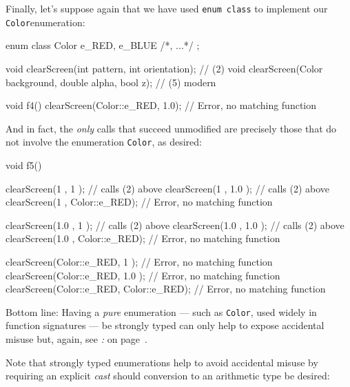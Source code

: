 \noindent Finally, let's suppose again that we have used
\texttt{enum}~\texttt{class} to implement our \texttt{Color}\linebreak[4]
\mbox{enumeration}:

\begin{emcppshiddenlisting}[emcppsbatch=e10]
enum class Color { e_RED, e_BLUE /*, ...*/ };
\end{emcppshiddenlisting}
\begin{emcppslisting}[emcppsbatch=e10]
void clearScreen(int pattern, int orientation);            // (2)
void clearScreen(Color background, double alpha, bool z);  // (5) modern

void f4()
{
    clearScreen(Color::e_RED, 1.0);  // Error, no matching function
}
\end{emcppslisting}

\noindent And in fact, the \emph{only} calls that succeed unmodified are precisely
those that do not involve the enumeration \texttt{Color}, as desired:

\begin{emcppslisting}[emcppsbatch=e10]
void f5()
{
    clearScreen(1           , 1           );  // calls (2) above
    clearScreen(1           , 1.0         );  // calls (2) above
    clearScreen(1           , Color::e_RED);  // Error, no matching function

    clearScreen(1.0         , 1           );  // calls (2) above
    clearScreen(1.0         , 1.0         );  // calls (2) above
    clearScreen(1.0         , Color::e_RED);  // Error, no matching function

    clearScreen(Color::e_RED, 1           );  // Error, no matching function
    clearScreen(Color::e_RED, 1.0         );  // Error, no matching function
    clearScreen(Color::e_RED, Color::e_RED);  // Error, no matching function
}
\end{emcppslisting}

\noindent Bottom line: Having a \emph{pure} enumeration --- such as
\texttt{Color}, used widely in function signatures --- be strongly typed
can only help to expose accidental misuse but, again, see
\textit{: } on page~\pageref{strong-typing-of-an-enum-class-can-be-counterproductive}.

Note that strongly typed enumerations help to avoid accidental misuse by
requiring an explicit \emph{cast} should conversion to an arithmetic
type be desired:

